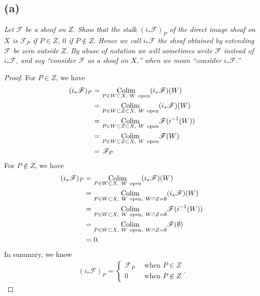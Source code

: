 \subsection{(a)}
\textit{Let $\mathscr F$ be a sheaf on $Z$. Show that the stalk $(i_{\ast}\mathscr F)_P$ of the direct image sheaf on $X$ is $\mathscr F_P$ if $P\in Z$, $0$ if $P\notin Z$. Hence we call $i_{\ast}\mathscr F$ the sheaf obtained by extending $\mathscr F$ be zero outside $Z$. By abuse of notation we will sometimes write $\mathscr F$ instead of $i_{\ast}\mathscr F$, and say \enquote{consider $\mathscr F$ as a sheaf on $X$,} when we mean \enquote{consider $i_{\ast}\mathscr F$.}}
\begin{proof}
    For $P\in Z$, we have 
    \begin{align*}
        (i_{\ast}\mathscr F)_P =&~ \underset{P\in W\subset X,~ W ~\text{open}}{\operatorname{Colim}} (i_{\ast}\mathscr F)(W)\\
        =&~ \underset{P\in W\subset Z\subset X,~ W ~\text{open}}{\operatorname{Colim}} (i_{\ast}\mathscr F)(W)\\
        =&~ \underset{P\in W\subset Z\subset X,~ W ~\text{open}}{\operatorname{Colim}} \mathscr F(i^{-1}(W))\\
        =&~ \underset{P\in W\subset Z\subset X,~ W ~\text{open}}{\operatorname{Colim}} \mathscr F(W)\\  
        =&~ \mathscr F_P
    \end{align*}
    For $P\notin Z$, we have 
    \begin{align*}
        (i_{\ast}\mathscr F)_P =&~ \underset{P\in W\subset X,~ W ~\text{open}}{\operatorname{Colim}} (i_{\ast}\mathscr F)(W)\\
        =&~ \underset{P\in W\subset X,~ W ~\text{open},~ W\cap Z=\emptyset }{\operatorname{Colim}} (i_{\ast}\mathscr F)(W)\\
        =&~ \underset{P\in W\subset X,~ W ~\text{open},~ W\cap Z=\emptyset }{\operatorname{Colim}} \mathscr F(i^{-1}(W))\\ 
        =&~ \underset{P\in W\subset X,~ W ~\text{open},~ W\cap Z=\emptyset }{\operatorname{Colim}} \mathscr F(\emptyset)\\  
        =&~ 0.
    \end{align*}
    In summary, we know 
    \begin{align*}
        (i_{\ast}\mathscr F)_P = \begin{cases}
            \mathscr F_P &~ \text{ when } P\in Z\\
            0 &~ \text{ when } P\notin Z
        \end{cases}.
    \end{align*}
\end{proof}


